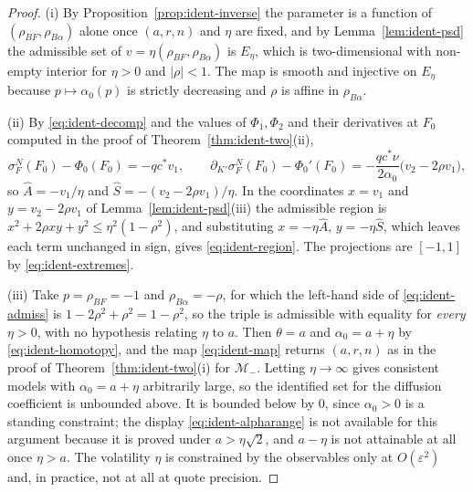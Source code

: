 \documentclass[../../../main.tex]{subfiles}
\begin{document}
\begin{proof}
(i) By Proposition~\ref{prop:ident-inverse} the parameter is a function of $(\rho_{BF},\rho_{B\alpha})$ alone once $(a,r,n)$ and $\eta$ are fixed, and by Lemma~\ref{lem:ident-psd} the admissible set of $v=\eta(\rho_{BF},\rho_{B\alpha})$ is $E_\eta$, which is two-dimensional with non-empty interior for $\eta>0$ and $|\rho|<1$. The map is smooth and injective on $E_\eta$ because $p\mapsto\alpha_0(p)$ is strictly decreasing and $\rho$ is affine in $\rho_{B\alpha}$.

(ii) By \eqref{eq:ident-decomp} and the values of $\Phi_1,\Phi_2$ and their derivatives at $F_0$ computed in the proof of Theorem~\ref{thm:ident-two}(ii),
\[
\sigma^N_F(F_0)-\Phi_0(F_0)=-qc^*v_1,\qquad
\partial_{K'}\sigma^N_F(F_0)-\Phi_0'(F_0)=-\frac{qc^*\nu}{2\alpha_0}\big(v_2-2\rho v_1\big),
\]
so $\hat A=-v_1/\eta$ and $\hat S=-(v_2-2\rho v_1)/\eta$. In the coordinates $x=v_1$ and $y=v_2-2\rho v_1$ of Lemma~\ref{lem:ident-psd}(iii) the admissible region is $x^2+2\rho xy+y^2\le\eta^2(1-\rho^2)$, and substituting $x=-\eta\hat A$, $y=-\eta\hat S$, which leaves each term unchanged in sign, gives \eqref{eq:ident-region}. The projections are $[-1,1]$ by \eqref{eq:ident-extremes}.

(iii) Take $p=\rho_{BF}=-1$ and $\rho_{B\alpha}=-\rho$, for which the left-hand side of \eqref{eq:ident-admiss} is $1-2\rho^2+\rho^2=1-\rho^2$, so the triple is admissible with equality for \emph{every} $\eta>0$, with no hypothesis relating $\eta$ to $a$. Then $\theta=a$ and $\alpha_0=a+\eta$ by \eqref{eq:ident-homotopy}, and the map \eqref{eq:ident-map} returns $(a,r,n)$ as in the proof of Theorem~\ref{thm:ident-two}(i) for $\mathcal M_-$. Letting $\eta\to\infty$ gives consistent models with $\alpha_0=a+\eta$ arbitrarily large, so the identified set for the diffusion coefficient is unbounded above. It is bounded below by $0$, since $\alpha_0>0$ is a standing constraint; the display \eqref{eq:ident-alpharange} is not available for this argument because it is proved under $a>\eta\sqrt2$, and $a-\eta$ is not attainable at all once $\eta>a$. The volatility $\eta$ is constrained by the observables only at $O(\varepsilon^2)$ and, in practice, not at all at quote precision.
\end{proof}
\end{document}
